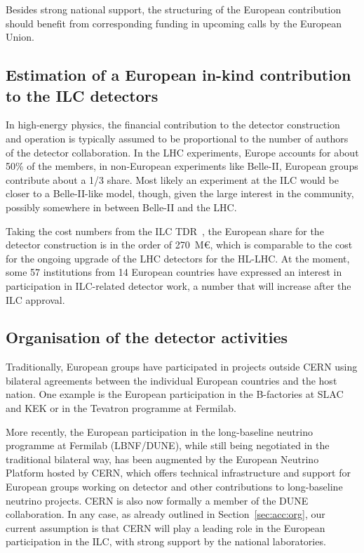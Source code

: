 \documentclass[%
 reprint,
 floatfix,
 amsmath,amssymb,
 aps,
]{revtex4-1}
\begin{document}
Besides strong national support, the structuring of the European contribution should benefit from corresponding funding in upcoming calls by the European Union.

\subsection{\label{sec:det:constructionmodel} Estimation of a
European in-kind contribution to the ILC detectors}

In high-energy physics, the financial contribution to the detector
construction and operation is typically assumed to be proportional to the number of authors of
the detector collaboration. In the LHC experiments, Europe accounts for about 50\% of the members, 
in non-European experiments like Belle-II, European groups contribute about a 1/3 share. Most likely 
an experiment at the ILC would be closer to a Belle-II-like model, though, given the large interest 
in the community, possibly somewhere in between Belle-II and the LHC. 

Taking the cost numbers from the ILC TDR~\cite{Behnke:2013lya}, the European share for the detector construction 
is in the order of 270~M\euro{}, which is comparable to the cost for the ongoing upgrade of the LHC detectors for the HL-LHC. 
At the moment, some 57 institutions from 14 European countries have expressed 
an interest in participation in ILC-related detector work, a number that will increase after the ILC approval.

\subsection{\label{sec:det:Organisation} Organisation of the detector activities}
Traditionally, European groups have participated in projects outside CERN using bilateral 
agreements between the individual European countries and the host nation. One example is the European 
participation in the B-factories at SLAC and KEK or in the Tevatron programme at 
Fermilab.

More recently, the European participation in the long-baseline neutrino 
programme at Fermilab (LBNF/DUNE), while still being negotiated in the 
traditional bilateral way, has been augmented by the European Neutrino Platform 
hosted by CERN, which offers technical infrastructure and support for European 
groups working on detector and other contributions to long-baseline neutrino 
projects. CERN is also now formally a member of the DUNE collaboration.
In any case, as already outlined in Section~\ref{sec:acc:org}, our current assumption is that 
CERN will play a leading role in the European participation in the ILC, 
with strong support by the national laboratories.
\end{document}
